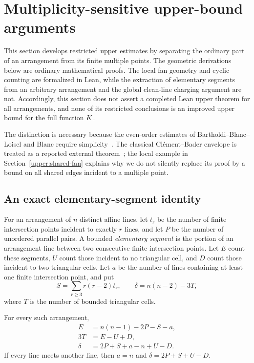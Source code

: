 \section{Multiplicity-sensitive upper-bound arguments}
\label{upper:scope}

This section develops restricted upper estimates by separating the ordinary part of an arrangement from its finite multiple points. The geometric derivations below are ordinary mathematical proofs. The local fan geometry and cyclic counting are formalized in Lean, while the extraction of elementary segments from an arbitrary arrangement and the global clean-line charging argument are not. Accordingly, this section does not assert a completed Lean upper theorem for all arrangements, and none of its restricted conclusions is an improved upper bound for the full function $K$.

The distinction is necessary because the even-order estimates of Bartholdi--Blanc--Loisel and Blanc require simplicity~\citep{bbl2008,blanc2011}. The classical Cl\'ement--Bader envelope is treated as a reported external theorem~\citep{clementbader2007}; the local example in Section~\ref{upper:shared-fan} explains why we do not silently replace its proof by a bound on all shared edges incident to a multiple point.

\subsection{An exact elementary-segment identity}

\begin{definition}
For an arrangement of $n$ distinct affine lines, let $t_r$ be the number of finite intersection points incident to exactly $r$ lines, and let $P$ be the number of unordered parallel pairs. A bounded \emph{elementary segment} is the portion of an arrangement line between two consecutive finite intersection points. Let $E$ count these segments, $U$ count those incident to no triangular cell, and $D$ count those incident to two triangular cells. Let $a$ be the number of lines containing at least one finite intersection point, and put
\[
 S=\sum_{r\ge3}r(r-2)t_r,\qquad
 \delta=n(n-2)-3T,
\]
where $T$ is the number of bounded triangular cells.
\end{definition}

\begin{proposition}
\label{upper:identity}
For every such arrangement,
\begin{align}
 E&=n(n-1)-2P-S-a,\\
 3T&=E-U+D,\\
 \delta&=2P+S+a-n+U-D.
 \label{upper:defect-general}
\end{align}
If every line meets another line, then $a=n$ and $\delta=2P+S+U-D$.
\end{proposition}

